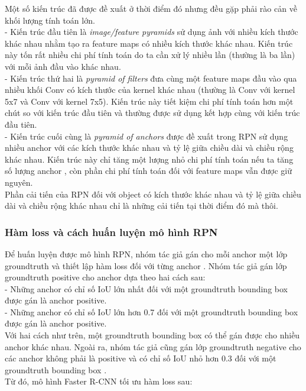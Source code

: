 {    \noindent
    Một số kiến trúc đã được đề xuất ở thời điểm đó nhưng đều gặp phải rào cản về khối lượng tính toán lớn. \\
    - Kiến trúc đầu tiên là \textit{image/feature pyramids} sử dụng ảnh với nhiều kích thước khác nhau nhằm tạo ra feature maps  có nhiều kích thước khác nhau.
    Kiến trúc này tốn rất nhiều chi phí tính toán do ta cần xử lý nhiều lần (thường là ba lần) với mỗi ảnh đầu vào khác nhau. \\
    - Kiến trúc thứ hai là \textit{pyramid of filters} đưa cùng một feature maps  đầu vào qua nhiều khối Conv có kích thước của kernel khác nhau (thường là Conv với kernel 5x7 và Conv với kernel 7x5).
    Kiến trúc này tiết kiệm chi phí tính toán hơn một chút so với kiến trúc đầu tiên và thường được sử dụng kết hợp cùng với kiến trúc đầu tiên. \\
    - Kiến trúc cuối cùng là \textit{pyramid of anchors} được đề xuất trong RPN sử dụng nhiều anchor  với các kích thước khác nhau và tỷ lệ giữa chiều dài và chiều rộng khác nhau.
    Kiến trúc này chỉ tăng một lượng nhỏ chi phí tính toán nếu ta tăng số lượng anchor , còn phần chi phí tính toán đối với feature maps  vẫn được giữ nguyên. \\
    Phần cải tiến của RPN đối với object có kích thước khác nhau và tỷ lệ giữa chiều dài và chiều rộng khác nhau chỉ là những cải tiến tại thời điểm đó mà thôi.

    \subsubsection*{Hàm loss và cách huấn luyện mô hình RPN}
    Để huấn luyện được mô hình RPN, nhóm tác giả gán cho mỗi anchor  một lớp groundtruth  và thiết lập hàm loss đối với từng anchor .
    Nhóm tác giả gán lớp groundtruth  positive cho anchor  dựa theo hai cách sau: \\
    - Những anchor  có chỉ số IoU  lớn nhất đối với một groundtruth  bounding box  được gán là anchor  positive. \\
    - Những anchor  có chỉ số IoU  lớn hơn 0.7 đối với một groundtruth  bounding box  được gán là anchor  positive. \\
    Với hai cách như trên, một groundtruth  bounding box  có thể gán được cho nhiều anchor  khác nhau.
    Ngoài ra, nhóm tác giả cũng gán lớp groundtruth  negative cho các anchor  không phải là positive và có chỉ số IoU  nhỏ hơn 0.3 đối với một groundtruth  bounding box . \\
    Từ đó, mô hình Faster R-CNN tối ưu hàm loss sau:

}
